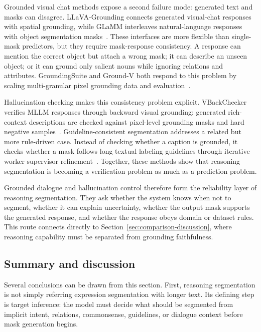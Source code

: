 Grounded visual chat methods expose a second failure mode: generated text and masks can disagree. LLaVA-Grounding connects generated visual-chat responses with spatial grounding, while GLaMM interleaves natural-language responses with object segmentation masks~\citep{zhangLlavagroundingGroundedVisual2024,rasheedGlammPixelGrounding2024}. These interfaces are more flexible than single-mask predictors, but they require mask-response consistency. A response can mention the correct object but attach a wrong mask; it can describe an unseen object; or it can ground only salient nouns while ignoring relations and attributes. GroundingSuite and Ground-V both respond to this problem by scaling multi-granular pixel grounding data and evaluation~\citep{huGroundingSuiteMeasuringComplex2025,zongGroundvTeachingVlms2025}.

Hallucination checking makes this consistency problem explicit. VBackChecker verifies MLLM responses through backward visual grounding: generated rich-context descriptions are checked against pixel-level grounding masks and hard negative samples~\citep{guoSeeingBelievingRichContext2026}. Guideline-consistent segmentation addresses a related but more rule-driven case. Instead of checking whether a caption is grounded, it checks whether a mask follows long textual labeling guidelines through iterative worker-supervisor refinement~\citep{vvatsGuidelineConsistentSegmentationMultiAgent2026}. Together, these methods show that reasoning segmentation is becoming a verification problem as much as a prediction problem.

Grounded dialogue and hallucination control therefore form the reliability layer of reasoning segmentation. They ask whether the system knows when not to segment, whether it can explain uncertainty, whether the output mask supports the generated response, and whether the response obeys domain or dataset rules. This route connects directly to Section~\ref{sec:comparison-discussion}, where reasoning capability must be separated from grounding faithfulness.

\subsection{Summary and discussion}

Several conclusions can be drawn from this section. First, reasoning segmentation is not simply referring expression segmentation with longer text. Its defining step is target inference: the model must decide what should be segmented from implicit intent, relations, commonsense, guidelines, or dialogue context before mask generation begins.

